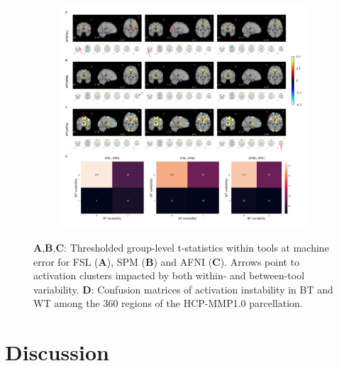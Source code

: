 \documentclass[11pt,onecolumn]{article}
\begin{document}

\begin{figure}[ht]
  \begin{subfigure}[ht]{\textwidth}
    \centering
    \includegraphics[width=\textwidth]{figures/act_deact-marked.pdf}
  \end{subfigure}
  \centering
  \caption{\textbf{A},\textbf{B},\textbf{C}: Thresholded group-level
    t-statistics within tools at machine error for FSL (\textbf{A}), SPM
    (\textbf{B}) and AFNI (\textbf{C}). Arrows point to activation clusters
    impacted by both within- and between-tool variability.
     \textbf{D}: Confusion matrices of
    activation instability in BT and WT among the 360 regions of the
    HCP-MMP1.0 parcellation.}
  \label{fig:thresh-maps}
\end{figure}


\section{Discussion}
\end{document}
